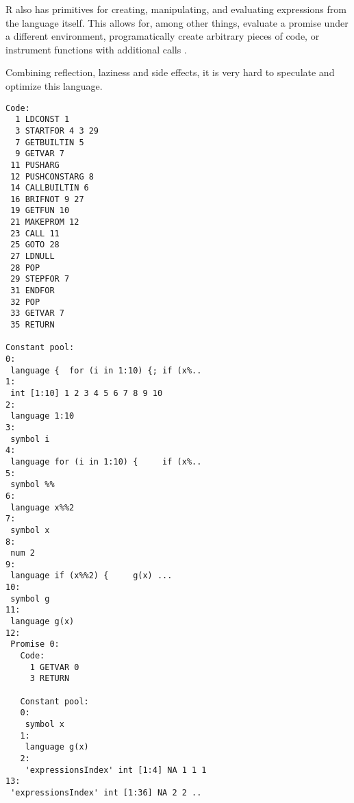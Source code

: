 R also has primitives for creating, manipulating, and evaluating expressions from the language itself. This allows for, among other things, evaluate a promise under a different environment, programatically create arbitrary pieces of code, or instrument functions with additional calls .

Combining reflection, laziness and side effects, it is very hard to speculate and optimize this language.


%

\begin{listing}
	\begin{verbatim}
Code:
  1 LDCONST 1
  3 STARTFOR 4 3 29
  7 GETBUILTIN 5
  9 GETVAR 7
 11 PUSHARG
 12 PUSHCONSTARG 8
 14 CALLBUILTIN 6
 16 BRIFNOT 9 27
 19 GETFUN 10
 21 MAKEPROM 12
 23 CALL 11
 25 GOTO 28
 27 LDNULL
 28 POP
 29 STEPFOR 7
 31 ENDFOR
 32 POP
 33 GETVAR 7
 35 RETURN

Constant pool:
0:
 language {  for (i in 1:10) {; if (x%..
1:
 int [1:10] 1 2 3 4 5 6 7 8 9 10
2:
 language 1:10
3:
 symbol i
4:
 language for (i in 1:10) {     if (x%..
5:
 symbol %%
6:
 language x%%2
7:
 symbol x
8:
 num 2
9:
 language if (x%%2) {     g(x) ...
10:
 symbol g
11:
 language g(x)
12:
 Promise 0:
   Code:
     1 GETVAR 0
     3 RETURN

   Constant pool:
   0:
    symbol x
   1:
    language g(x)
   2:
    'expressionsIndex' int [1:4] NA 1 1 1
13:
 'expressionsIndex' int [1:36] NA 2 2 ..
  \end{verbatim}
\end{listing}

